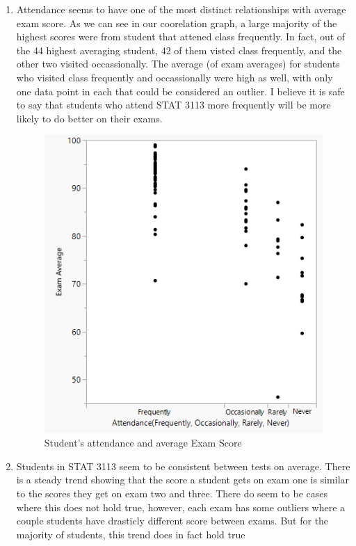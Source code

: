 \documentclass[14pt]{article}
\begin{document}
\begin{enumerate}
\item

Attendance seems to have one of the most distinct relationships with average exam score. As we can see in our coorelation graph, a large majority of the highest scores were from student that attened class frequently. In fact, out of the 44 highest averaging student, 42 of them visted class frequently, and the other two visited occassionally. The average (of exam averages) for students who visited class frequently and occassionally were high as well, with only one data point in each that could be considered an outlier. I believe it is safe to say that students who attend STAT 3113 more frequently will be more likely to do better on their exams.

\vspace{5em}

\begin{figure}[h]
\caption*{Student's attendance and average Exam Score}
\centering
\includegraphics{exam1/1.png}
\end{figure}

\pagebreak

\item
Students in STAT 3113 seem to be consistent between tests on average. There is a steady trend showing that the score a student gets on exam one is similar to the scores they get on exam two and three. There do seem to be cases where this does not hold true, however, each exam has some outliers where a couple students have drasticly different score between exams. But for the majority of students, this trend does in fact hold true 


\end{enumerate}
\end{document}
